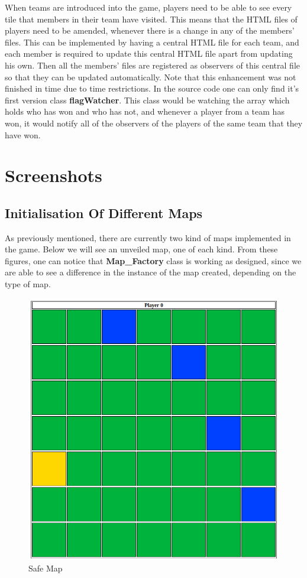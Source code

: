 \documentclass{article}
\begin{document}
When teams are introduced into the game, players need to be able to see every tile that 
members in their team have visited. This means that the HTML files of players need to be 
amended, whenever there is a change in any of the members' files. This can be implemented 
by having a central HTML file for each team, and each member is required to update this 
central HTML file apart from updating his own. Then all the members' files are registered 
as observers of this central file so that they can be updated automatically. Note that this enhancement was not finished in time due to time restrictions. In the source code one can only find it's first version class \textbf{flagWatcher}. This class would be watching the array which holds who has won and who has not, and whenever a player from a team has won, it would notify all of the observers of the players of the same team that they have won. 

\section{Screenshots}

\subsection{Initialisation Of Different Maps}

\noindent
As previously mentioned, there are currently two kind of maps implemented in the game. Below we will see an unveiled map, one of each kind. From these figures, one can notice that \textbf{Map\_Factory} class is working as designed, since we are able to see a difference in the instance of the map created, depending on the type of map. 

	\begin{figure}[h]
		\centering
	    \includegraphics[width=0.6\linewidth]{./Images/safe_map.png}
		\caption{Safe Map}
	\end{figure}
\end{document}
